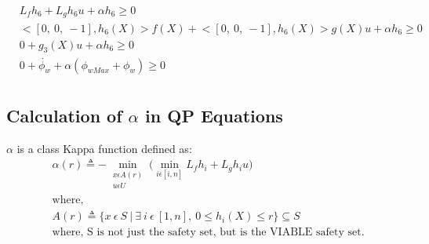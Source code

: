 \documentclass[journal, onecolumn]{IEEEtran} %
\begin{document}
\begin{equation}
    \begin{aligned}
        &L_fh_6 + L_g h_6 u + \alpha h_6 \geq 0 \\
        &\Big< [0,\ 0,\ -1], h_6(X)\Big> f(X) + \Big< [0,\ 0,\ -1], h_6(X)\Big> g(X)u + \alpha h_6 \geq 0 \\
        &0 + g_3(X)u + \alpha h_6 \geq 0 \\
        &0 + \dot{\phi_w} + \alpha (\phi_{wMax} + \phi_w) \geq 0 \\
    \end{aligned}
\end{equation}


\subsection{Calculation of $\alpha$ in QP Equations}
$\alpha$ is a class Kappa function defined as:
\begin{equation}
    \begin{aligned}
        &\alpha(r) \triangleq - \min_{\begin{array} {c}\scriptstyle x \epsilon A(r) \\[-4pt]
                \scriptstyle u \epsilon U \end{array} }
        \Big( \min_{i \epsilon [i,n]} L_fh_i + L_gh_iu\Big) \\
        &\text{where,}  \\
        &A(r) \triangleq \{ x \ \epsilon \ S \ | \ 
        \exists \ i \ \epsilon \ [1, n], \ 0 \leq h_i(X) \leq r \} \subseteq S \\
        &\text{where, S is not just the safety set, but is the VIABLE safety set.}
    \end{aligned}
\end{equation}
\end{document}
